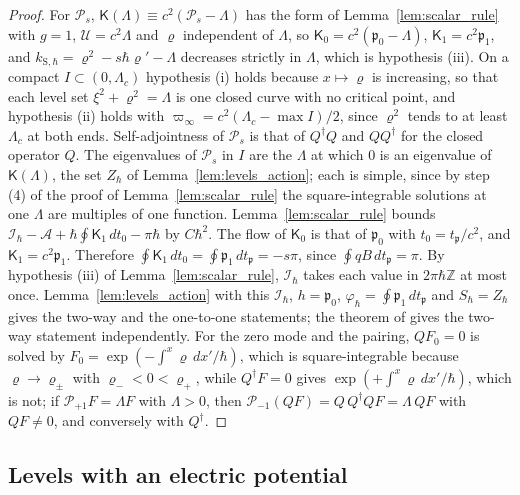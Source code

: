\documentclass[aps,prd,onecolumn,tightenlines,nofootinbib,notitlepage,11pt,floatfix]{revtex4-2}
\theoremstyle{indentedtheorem}
\begin{document}
\begin{proof}
For $\mathcal{P}_s$, $\mathsf{K}(\Lambda)\equiv c^2(\mathcal{P}_s-\Lambda)$ has the form of Lemma~\ref{lem:scalar_rule} with $g=1$, $\mathcal{U}=c^2\Lambda$ and $\varrho$ independent of $\Lambda$, so $\mathsf{K}_0=c^2(\mathfrak{p}_0-\Lambda)$, $\mathsf{K}_1=c^2\mathfrak{p}_1$, and $k_{\text{S},\hbar}=\varrho^2-s\hbar\varrho'-\Lambda$ decreases strictly in $\Lambda$, which is hypothesis (iii). On a compact $I\subset(0,\Lambda_c)$ hypothesis (i) holds because $x\mapsto\varrho$ is increasing, so that each level set $\xi^2+\varrho^2=\Lambda$ is one closed curve with no critical point, and hypothesis (ii) holds with $\varpi_\infty=c^2(\Lambda_c-\max I)/2$, since $\varrho^2$ tends to at least $\Lambda_c$ at both ends. Self-adjointness of $\mathcal{P}_s$ is that of $Q^\dagger Q$ and $QQ^\dagger$ for the closed operator $Q$. The eigenvalues of $\mathcal{P}_s$ in $I$ are the $\Lambda$ at which $0$ is an eigenvalue of $\mathsf{K}(\Lambda)$, the set $Z_\hbar$ of Lemma~\ref{lem:levels_action}; each is simple, since by step (4) of the proof of Lemma~\ref{lem:scalar_rule} the square-integrable solutions at one $\Lambda$ are multiples of one function. Lemma~\ref{lem:scalar_rule} bounds $\mathcal{I}_\hbar-\mathcal{A}+\hbar\oint\mathsf{K}_1\,dt_0-\pi\hbar$ by $C\hbar^2$. The flow of $\mathsf{K}_0$ is that of $\mathfrak{p}_0$ with $t_0=t_\mathfrak{p}/c^2$, and $\mathsf{K}_1=c^2\mathfrak{p}_1$. Therefore $\oint\mathsf{K}_1\,dt_0=\oint\mathfrak{p}_1\,dt_\mathfrak{p}=-s\pi$, since $\oint qB\,dt_\mathfrak{p}=\pi$. By hypothesis (iii) of Lemma~\ref{lem:scalar_rule}, $\mathcal{I}_\hbar$ takes each value in $2\pi\hbar\mathbb{Z}$ at most once. Lemma~\ref{lem:levels_action} with this $\mathcal{I}_\hbar$, $h=\mathfrak{p}_0$, $\varphi_\hbar=\oint\mathfrak{p}_1\,dt_\mathfrak{p}$ and $S_\hbar=Z_\hbar$ gives the two-way and the one-to-one statements; the theorem of \citet{IfaLouatiRouleux2017Bohr} gives the two-way statement independently. For the zero mode and the pairing, $QF_0=0$ is solved by $F_0=\exp(-\int^x\varrho\,dx'/\hbar)$, which is square-integrable because $\varrho\to\varrho_\pm$ with $\varrho_-<0<\varrho_+$, while $Q^\dagger F=0$ gives $\exp(+\int^x\varrho\,dx'/\hbar)$, which is not; if $\mathcal{P}_{+1}F=\Lambda F$ with $\Lambda>0$, then $\mathcal{P}_{-1}(QF)=Q\,Q^\dagger QF=\Lambda\,QF$ with $QF\neq0$, and conversely with $Q^\dagger$.
\end{proof}

\subsection{Levels with an electric potential}
\label{sup:proof_levels_V}
\end{document}
